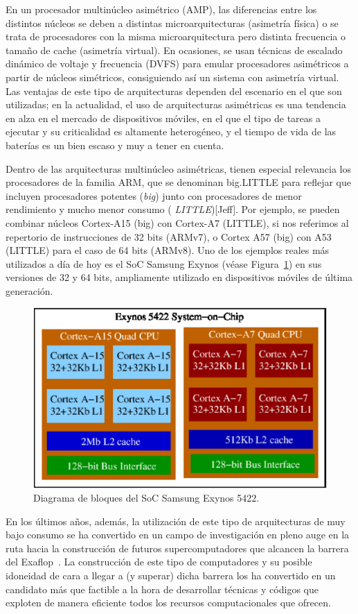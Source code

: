 En un procesador multinúcleo asimétrico (AMP), las diferencias entre los
distintos núcleos se deben a distintas microarquitecturas (asimetría
física) o se trata de procesadores con la misma microarquitectura pero
distinta frecuencia o tamaño de cache (asimetría virtual). En ocasiones, se
usan técnicas de escalado dinámico de voltaje y frecuencia (DVFS) para
emular procesadores asimétricos a partir de núcleos simétricos,
consiguiendo así un sistema con asimetría virtual. Las ventajas de este
tipo de arquitecturas dependen del escenario en el que son utilizadas; en
la actualidad, el uso de arquitecturas asimétricas es una tendencia en alza
en el mercado de dispositivos móviles, en el que el tipo de tareas a
ejecutar y su criticalidad es altamente heterogéneo, y el tiempo de vida de
las baterías es un bien escaso y muy a tener en cuenta.

Dentro de las arquitecturas multinúcleo asimétricas, tienen especial
relevancia los procesadores de la familia ARM, que se denominan big.LITTLE
para reflejar que incluyen procesadores potentes ({\em big}) junto con
procesadores de menor rendimiento y mucho menor consumo ({\em
  LITTLE})[Jeff]. Por ejemplo, se pueden combinar núcleos Cortex-A15 (big)
con Cortex-A7 (LITTLE), si nos referimos al repertorio de instrucciones de
32 bits (ARMv7), o Cortex A57 (big) con A53 (LITTLE) para el caso de 64
bits (ARMv8). Uno de los ejemplos reales más utilizados a día de hoy es el
SoC Samsung Exynos (véase Figura~\ref{fig:exynos}) en sus versiones de 32 y
64 bits, ampliamente utilizado en dispositivos móviles de última
generación.

\begin{figure}[th!]
\begin{center}
\includegraphics[width=0.4\columnwidth]{Figures/Exynos.eps}
\end{center}
\caption{\label{fig:exynos} Diagrama de bloques del SoC Samsung Exynos 5422.}
\end{figure}

En los últimos años, además, la utilización de este tipo de arquitecturas de muy bajo consumo se ha
convertido en un campo de investigación en pleno auge en la ruta hacia la construcción de futuros
supercomputadores que alcancen la barrera del Exaflop~\cite{Road,MontBlanc}. La construcción
de este tipo de computadores y su posible idoneidad de cara a llegar a (y superar) dicha barrera
los ha convertido en un candidato más que factible a la hora de desarrollar técnicas y códigos
que exploten de manera eficiente todos los recursos computacionales que ofrecen.

